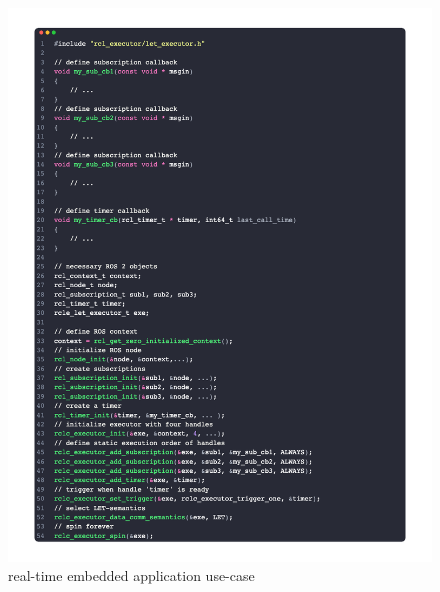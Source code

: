 \begin{figure}[htbp!]
    \centering
    \includegraphics[width=1\linewidth]{Img/code/example1.png}
    \caption{real-time embedded application use-case}\label{f:example1}
    \vspace{-0.1in}
\end{figure}


